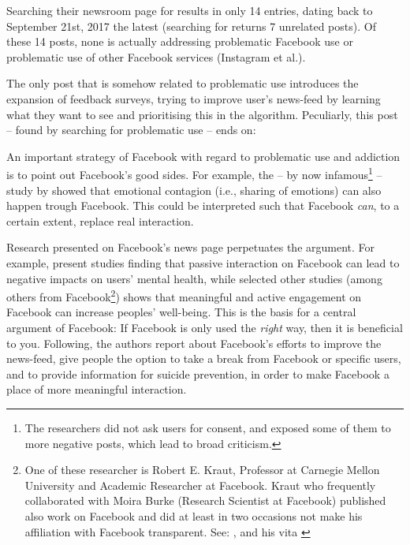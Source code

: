 Searching their newsroom page for  results in only 14 entries, dating back to September 21st, 2017 the latest (searching for  returns 7 unrelated posts).
Of these 14 posts, none is actually addressing problematic Facebook use or problematic use of other Facebook services (Instagram et al.).

The only post that is somehow related to problematic use introduces the expansion of feedback surveys, trying to improve user's news-feed by learning what they want to see and prioritising this in the algorithm.
Peculiarly, this post -- found by searching for problematic use -- ends on:  \citep{gupta_incorporating_2021}

An important strategy of Facebook with regard to problematic use and addiction is to point out Facebook's good sides.
For example, the -- by now infamous\footnote{The researchers did not ask users for consent, and exposed some of them to more negative posts, which lead to broad criticism.} -- study by \citet{kramer_experimental_2014} showed that emotional contagion (i.e., sharing of emotions) can also happen trough Facebook. 
This could be interpreted such that Facebook \emph{can}, to a certain extent, replace real interaction.

Research presented on Facebook's news page perpetuates the argument. 
For example, \citet{ginsberg_hard_2017} present studies finding that passive interaction on Facebook can lead to negative impacts on users' mental health, while selected other studies (among others from Facebook\footnote{One of these researcher is Robert E. Kraut, Professor at Carnegie Mellon University and Academic Researcher at Facebook. Kraut who frequently collaborated with Moira Burke (Research Scientist at Facebook) published also work on Facebook and did at least in two occasions not make his affiliation with Facebook transparent. See: \citep{burke_using_2013}, \citep{burke_relationship_2016} and his vita \citep{kraut_vita_2020} }) shows that meaningful and active engagement on Facebook can increase peoples' well-being.
This is the basis for a central argument of Facebook: If Facebook is only used the \textit{right} way, then it is beneficial to you. 
Following, the authors report about Facebook's efforts to improve the news-feed, give people the option to take a break from Facebook or specific users, and to provide information for suicide prevention, in order to make Facebook a place of more meaningful interaction.


